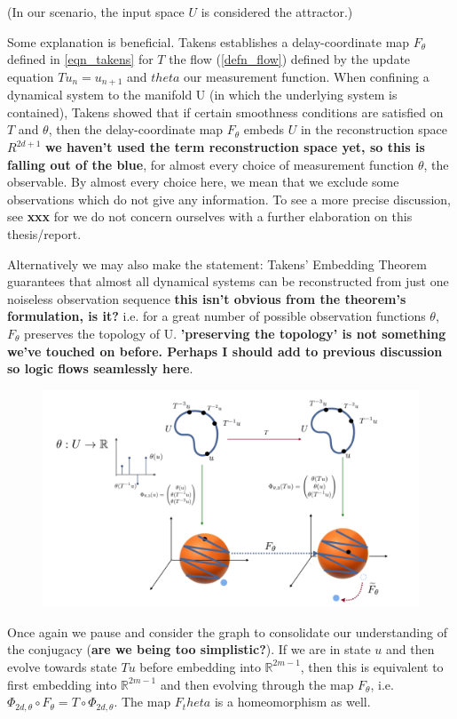 \documentclass[12 pt]{article}
\newcommand{\Ftheta}{\ensuremath{F_\theta}}
\begin{document}
(In our scenario, the input space $U$ is considered the attractor.)

Some explanation is beneficial. Takens establishes a delay-coordinate map $\Ftheta$ defined in \ref{eqn_takens} for $T$ the flow (\ref{defn_flow}) defined by the update equation  $Tu_n=u_{n+1}$ and $theta$ our measurement function. When confining a dynamical system to the manifold U (in which the underlying system is contained), Takens showed that if certain smoothness conditions are satisfied on $T$ and $\theta$, then the delay-coordinate map $\Ftheta$ embeds $U$ in the reconstruction space $R^{2d+1}$ \textbf{we haven't used the term reconstruction space yet, so this is falling out of the blue}, for almost every choice of measurement function $\theta$, the observable. By almost every choice here, we mean that we exclude some observations which do not give any information. To see a more precise discussion, see \textbf{xxx} for we do not concern ourselves with a further elaboration on this thesis/report.

Alternatively we may also make the statement: Takens' Embedding Theorem guarantees that almost all dynamical systems can be reconstructed from just one noiseless observation sequence \textbf{this isn't obvious from the theorem's formulation, is it?} i.e. for a great number of possible observation functions $\theta$, $\Ftheta$ preserves the topology of U. \textbf{'preserving the topology' is not something we've touched on before. Perhaps I should add to previous discussion so logic flows seamlessly here}.

\begin{figure}[ht]
  \includegraphics[scale=0.3]{takensmap.png}
  \centering
  \label{fig:takensmap}
\end{figure}

Once again we pause and consider the graph to consolidate our understanding of the conjugacy (\textbf{are we being too simplistic?}). If we are in state $u$ and then evolve towards state $Tu$ before embedding into $\mathbb{R}^{2m-1}$, then this is equivalent to first embedding into $\mathbb{R}^{2m-1}$ and then evolving through the map $\Ftheta$, i.e. $\Phi_{2d,\theta}\circ{F}_{\theta} = T\circ\Phi_{2d,\theta}$. The map $F_theta$ is a homeomorphism as well. 
\end{document}
